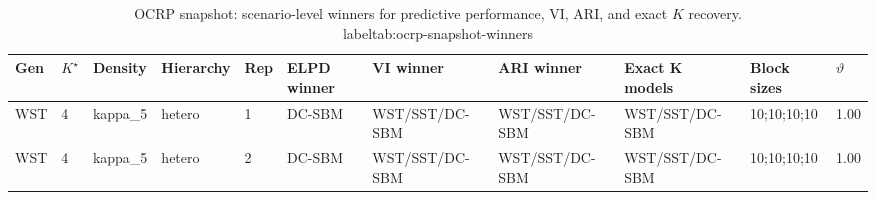 \begin{table}[!h]
\centering
\caption{OCRP snapshot: scenario-level winners for predictive performance, VI, ARI, and exact $K$ recovery.\\label{tab:ocrp-snapshot-winners}}
\centering
\begin{tabular}[t]{lllllllllll}
\toprule
Gen & $K^\star$ & Density & Hierarchy & Rep & ELPD winner & VI winner & ARI winner & Exact K models & Block sizes & $\vartheta$\\
\midrule
WST & 4 & kappa_5 & hetero & 1 & DC-SBM & WST/SST/DC-SBM & WST/SST/DC-SBM & WST/SST/DC-SBM & 10;10;10;10 & 1.00\\
WST & 4 & kappa_5 & hetero & 2 & DC-SBM & WST/SST/DC-SBM & WST/SST/DC-SBM & WST/SST/DC-SBM & 10;10;10;10 & 1.00\\
\bottomrule
\end{tabular}
\end{table}
